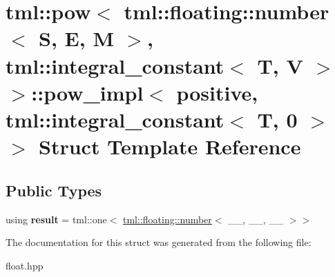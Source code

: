 \hypertarget{structtml_1_1pow_3_01tml_1_1floating_1_1number_3_01S_00_01E_00_01M_01_4_00_01tml_1_1integral__co517f9860170f0627b591e9239a9c1aba}{\section{tml\+:\+:pow$<$ tml\+:\+:floating\+:\+:number$<$ S, E, M $>$, tml\+:\+:integral\+\_\+constant$<$ T, V $>$ $>$\+:\+:pow\+\_\+impl$<$ positive, tml\+:\+:integral\+\_\+constant$<$ T, 0 $>$ $>$ Struct Template Reference}
\label{structtml_1_1pow_3_01tml_1_1floating_1_1number_3_01S_00_01E_00_01M_01_4_00_01tml_1_1integral__co517f9860170f0627b591e9239a9c1aba}
}
\subsection*{Public Types}
\begin{DoxyCompactItemize}
\item 
\hypertarget{structtml_1_1pow_3_01tml_1_1floating_1_1number_3_01S_00_01E_00_01M_01_4_00_01tml_1_1integral__co517f9860170f0627b591e9239a9c1aba_a981063619bc64905e61589aa6b56fc07}{using {\bfseries result} = tml\+::one$<$ \hyperlink{structtml_1_1floating_1_1number}{tml\+::floating\+::number}$<$ \+\_\+\+\_\+, \+\_\+\+\_\+, \+\_\+\+\_\+ $>$$>$}\label{structtml_1_1pow_3_01tml_1_1floating_1_1number_3_01S_00_01E_00_01M_01_4_00_01tml_1_1integral__co517f9860170f0627b591e9239a9c1aba_a981063619bc64905e61589aa6b56fc07}

\end{DoxyCompactItemize}


The documentation for this struct was generated from the following file\+:\begin{DoxyCompactItemize}
\item 
float.\+hpp\end{DoxyCompactItemize}
